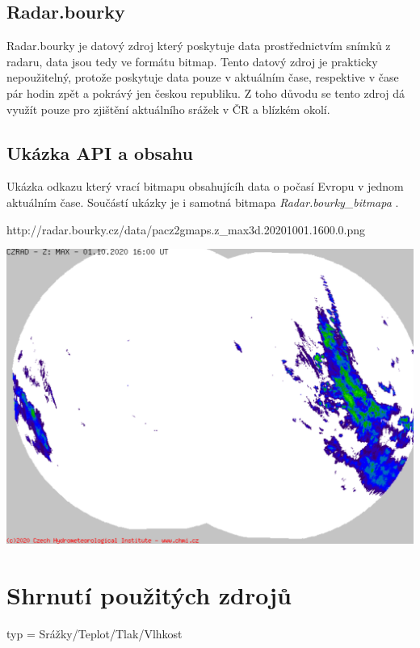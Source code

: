 \documentclass[czech,bachelor,dept460,male,csharp,cpdeclaration]{diploma}
\begin{document}
	\subsection{Radar.bourky}
	
	Radar.bourky je datový zdroj který poskytuje data prostřednictvím snímků z radaru, data jsou tedy ve formátu bitmap. Tento datový zdroj je prakticky nepoužitelný, protože poskytuje data pouze v aktuálním čase, respektive v čase pár hodin zpět a pokrávý jen českou republiku. Z toho důvodu se tento zdroj dá využít pouze pro zjištění aktuálního srážek v ČR a blízkém okolí.
	
	\subsection{Ukázka API a obsahu}
	
	Ukázka odkazu který vrací bitmapu obsahujícíh data o počasí Evropu v jednom aktuálním čase. Součástí ukázky je i samotná bitmapa \emph{Radar.bourky\_bitmapa} \cite{chmi}.
	
	http://radar.bourky.cz/data/pacz2gmaps.z\_max3d.20201001.1600.0.png
	
	\includegraphics[scale=0.5]{Data/Rb_ukazka.png}
	
	\section{Shrnutí použitých zdrojů}
	
	typ = Srážky/Teplot/Tlak/Vlhkost
	
\end{document}

